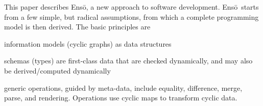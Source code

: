 \documentclass[11pt]{article}
\title{\Enso}
\author{William R. Cook and Tijs van der Storm}
\newcommand{\Enso}{Ens\={o}}
\begin{document}
\maketitle

This paper describes \Enso, a new approach to software 
development. \Enso\ starts from a few simple, but radical
assumptions, from which a complete programming model is then
derived. The basic principles are

information models (cyclic graphs) as data structures

schemas (types) are first-class data that are checked dynamically,
and may also be derived/computed dynamically

generic operations, guided by meta-data, include equality, difference,
merge, parse, and rendering. Operations use cyclic maps to transform 
cyclic data.
\end{document}
